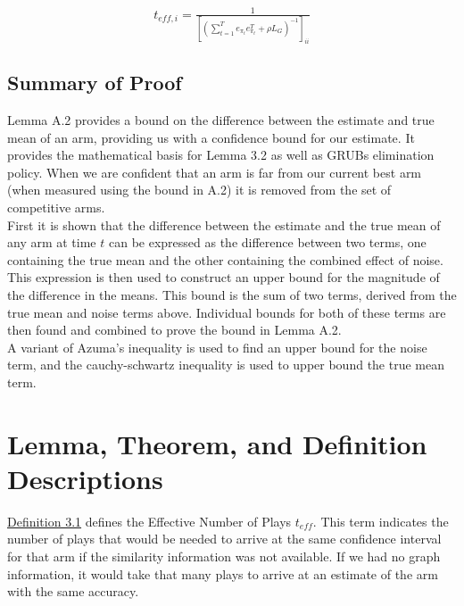 \documentclass{article}[12pt]
\begin{document}
\begin{equation}
t_{eff,i} = \tfrac{1}{\left[ \left( \sum_{t=1}^T e_{\pi_t} e_{\pi_t}^T + \rho L_G \right)^{-1} \right]_{ii}}
\end{equation}

\subsection{Summary of Proof}

Lemma A.2 provides a bound on the difference between the estimate and true mean of an arm, providing us with a confidence bound for our estimate.
It provides the mathematical basis for Lemma 3.2 as well as GRUBs elimination policy.
When we are confident that an arm is far from our current best arm (when measured using the bound in A.2) it is removed from the set of competitive arms.	\\

First it is shown that the difference between the estimate and the true mean of any arm at time $t$ can be expressed as the difference between two terms,
one containing the true mean and the other containing the combined effect of noise. \\

This expression is then used to construct an upper bound for the magnitude of the difference in the means.
This bound is the sum of two terms, derived from the true mean and noise terms above.
Individual bounds for both of these terms are then found and combined to prove the bound in Lemma A.2. \\

A variant of Azuma’s inequality is used to find an upper bound for the noise term, and the cauchy-schwartz inequality is used to upper bound the true mean term.

\pagebreak

\section{Lemma, Theorem, and Definition Descriptions}

\underline{Definition 3.1} defines the Effective Number of Plays $t_{eff}$.
This term indicates the number of plays that would be needed to arrive at the same confidence interval for that arm if the similarity information was not available.
If we had no graph information, it would take that many plays to arrive at an estimate of the arm with the same accuracy. \\
\end{document}
